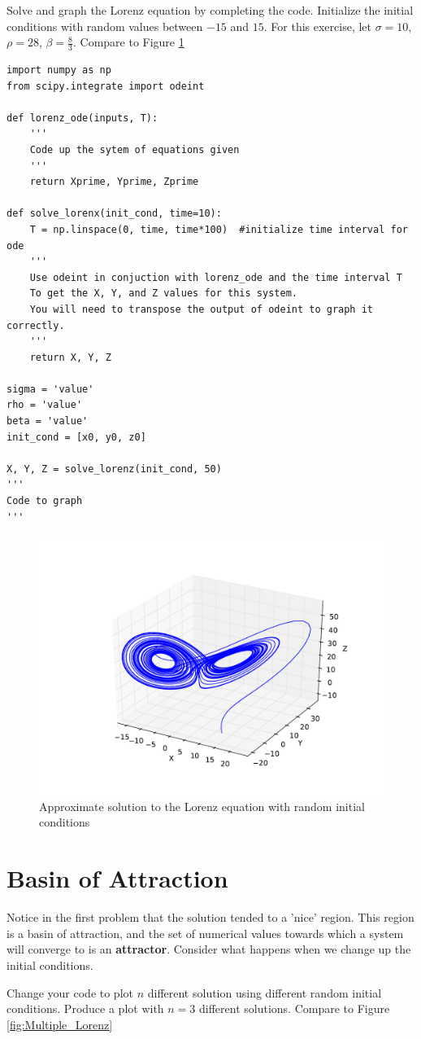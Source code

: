 \begin{problem}
Solve and graph the Lorenz equation by completing the code.
Initialize the initial conditions with random values between $-15$ and $15$.
For this exercise, let $\sigma=10$, $\rho=28$, $\beta=\frac{8}{3}$.
Compare to Figure \ref{fig:Single_Lorenz}
\begin{lstlisting}
import numpy as np
from scipy.integrate import odeint

def lorenz_ode(inputs, T):
	'''
	Code up the sytem of equations given
	'''
	return Xprime, Yprime, Zprime

def solve_lorenx(init_cond, time=10):
	T = np.linspace(0, time, time*100)	#initialize time interval for ode
	'''
	Use odeint in conjuction with lorenz_ode and the time interval T
	To get the X, Y, and Z values for this system.
	You will need to transpose the output of odeint to graph it correctly.
	'''
 	return X, Y, Z

sigma = 'value'
rho = 'value'
beta = 'value'
init_cond = [x0, y0, z0]

X, Y, Z = solve_lorenz(init_cond, 50)
'''
Code to graph
'''
\end{lstlisting}
\end{problem}


\begin{figure}
\includegraphics[width=\textwidth]{figures/Single_Lorenz.pdf}
\caption{Approximate solution to the Lorenz equation with random initial conditions}
\label{fig:Single_Lorenz}
\end{figure}

\section*{Basin of Attraction}
Notice in the first problem that the solution tended to a 'nice' region.
This region is a basin of attraction, and the set of numerical values towards which a system will converge to is an \textbf{attractor}.
Consider what happens when we change up the initial conditions.
\begin{problem}
Change your code to plot $n$ different solution using different random initial conditions.
Produce a plot with $n=3$ different solutions.
Compare to Figure \ref{fig:Multiple_Lorenz}
\end{problem}

